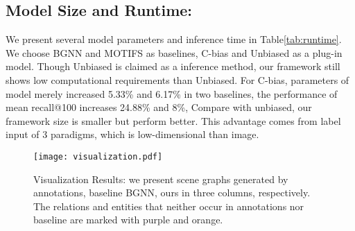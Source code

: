 \documentclass[runningheads]{llncs}
\begin{document}
\subsection{Model Size and Runtime:}
We present several model parameters and inference time in
Table\ref{tab:runtime}. We choose BGNN and MOTIFS as baselines, C-bias and
Unbiased\cite{unbias} as a plug-in model. Though Unbiased is claimed as a
inference  method, our framework still shows low computational requirements
than Unbiased.	For C-bias, parameters of model merely increased 5.33\% and
6.17\% in two baselines, the performance of mean recall@100 increases 24.88\%
and 8\%, Compare with unbiased, our framework size is smaller but perform
better. This advantage comes from label input of 3 paradigms, which is
low-dimensional than image.
\begin{table}[t]
  \centering
  \caption{Compariation of model size and runtime }
  \label{tab:runtime}
\end{table}
\begin{figure}[t]
  \centering

  \texttt{[image: visualization.pdf]}





\caption{Visualization Results: we present scene graphs generated by
    annotations, baseline BGNN, ours in three columns, respectively. The relations
    and entities that neither occur in annotations nor baseline are marked with
    purple and orange.}
  \label{visual}
\end{figure}
\end{document}
